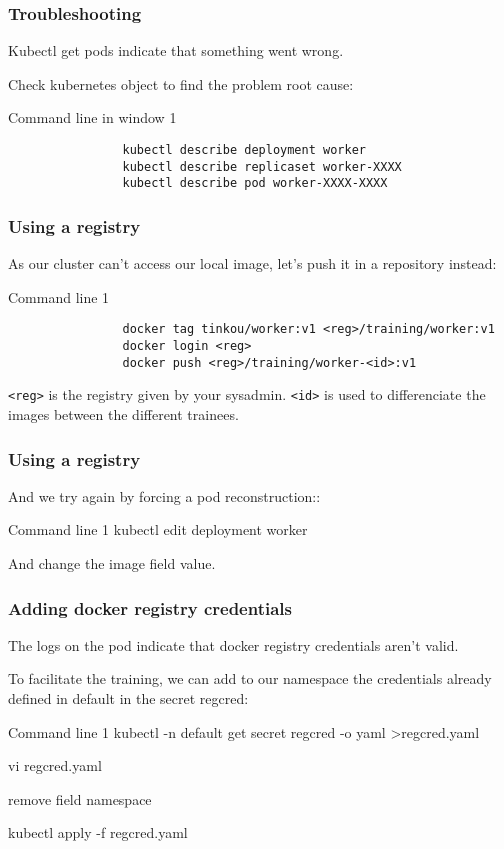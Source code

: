 	\begin{frame}[fragile]
		\frametitle{Troubleshooting}
		
		Kubectl get pods indicate that something went wrong.
		
		Check kubernetes object to find the problem root cause:
		\begin{block}{Command line in window 1}
			\begin{verbatim}
				kubectl	describe deployment worker
				kubectl describe replicaset worker-XXXX
				kubectl describe pod worker-XXXX-XXXX
			\end{verbatim}
		\end{block}
		
	\end{frame}
	
	\begin{frame}[fragile]
		\frametitle{Using a registry}
		
		As our cluster can't access our local image, let's push it in a repository instead:
		\begin{block}{Command line 1}
			\begin{verbatim}
				docker tag tinkou/worker:v1 <reg>/training/worker:v1
				docker login <reg>
				docker push <reg>/training/worker-<id>:v1
			\end{verbatim}
		\end{block}
		\verb|<reg>| is the registry given by your sysadmin.
		\verb|<id>| is used to differenciate the images between the different trainees.

	\end{frame}
	
	\begin{frame}
		\frametitle{Using a registry}
	
		And we try again by forcing a pod reconstruction::
		\begin{block}{Command line 1}
			kubectl edit deployment worker
			
			\bigskip
			And change the image field value.
		\end{block}
	
	\end{frame}

	\begin{frame}
		\frametitle{Adding docker registry credentials}
		
		The logs on the pod indicate that docker registry credentials aren't valid.
		
		To facilitate the training, we can add to our namespace the credentials already defined in default in the secret regcred:
		\begin{block}{Command line 1}
				kubectl -n default get secret regcred -o yaml >regcred.yaml
				
				\medskip
				vi regcred.yaml
				
				remove field namespace
				
				\medskip
				kubectl apply -f regcred.yaml
		\end{block}
	\end{frame}
	
